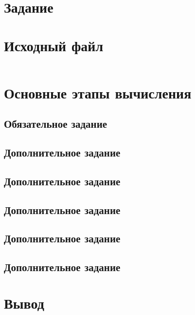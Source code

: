 


	
	
	\tableofcontents
	\newpage
	
	\section{Задание}
	
	
	\section{Исходный файл}
	\inputminted{xml}{../schedule.xml}
	
	\section{Основные этапы вычисления}
	\subsection{Обязательное задание}
	
	
	\subsection{Дополнительное задание }
	
	
	\subsection{Дополнительное задание }
	
	
	\subsection{Дополнительное задание }
	
	
	\subsection{Дополнительное задание }
	
	
	\subsection{Дополнительное задание }
	
	
	\section{Вывод}
	
	
